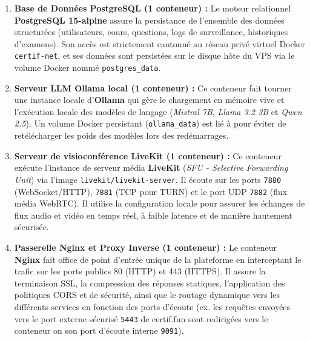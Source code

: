 \begin{enumerate}
    \item \textbf{Base de Données PostgreSQL (1 conteneur) :} 
    Le moteur relationnel \textbf{PostgreSQL 15-alpine} assure la persistance de l'ensemble des données structurées (utilisateurs, cours, questions, logs de surveillance, historiques d'examens). Son accès est strictement cantonné au réseau privé virtuel Docker \texttt{certif-net}, et ses données sont persistées sur le disque hôte du VPS via le volume Docker nommé \texttt{postgres\_data}.
    
    \item \textbf{Serveur LLM Ollama local (1 conteneur) :} 
    Ce conteneur fait tourner une instance locale d'\textbf{Ollama} qui gère le chargement en mémoire vive et l'exécution locale des modèles de langage (\textit{Mistral 7B}, \textit{Llama 3.2 3B} et \textit{Qwen 2.5}). Un volume Docker persistant (\texttt{ollama\_data}) est lié à  pour éviter de retélécharger les poids des modèles lors des redémarrages.
    
    \item \textbf{Serveur de visioconférence LiveKit (1 conteneur) :} 
    Ce conteneur exécute l'instance de serveur média \textbf{LiveKit} (\textit{SFU - Selective Forwarding Unit}) via l'image \texttt{livekit/livekit-server}. Il écoute sur les ports \texttt{7880} (WebSocket/HTTP), \texttt{7881} (TCP pour TURN) et le port UDP \texttt{7882} (flux média WebRTC). Il utilise la configuration locale  pour assurer les échanges de flux audio et vidéo en temps réel, à faible latence et de manière hautement sécurisée.
    
    \item \textbf{Passerelle Nginx et Proxy Inverse (1 conteneur) :} 
    Le conteneur \textbf{Nginx} fait office de point d'entrée unique de la plateforme en interceptant le trafic sur les ports publics 80 (HTTP) et 443 (HTTPS). Il assure la terminaison SSL, la compression des réponses statiques, l'application des politiques CORS et de sécurité, ainsi que le routage dynamique vers les différents services en fonction des ports d'écoute (ex. les requêtes envoyées vers le port externe sécurisé \texttt{5443} de certif.fun sont redirigées vers le conteneur  on son port d'écoute interne \texttt{9091}).
\end{enumerate}

